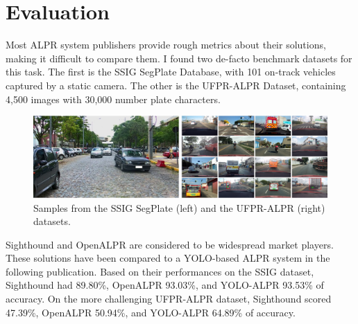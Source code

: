 \section{Evaluation}

Most ALPR system publishers provide rough metrics about their solutions, making it difficult to compare them. I found two de-facto benchmark datasets for this task. The first is the SSIG SegPlate Database\cite{SSIG-ALPR}, with 101 on-track vehicles captured by a static camera. The other is the UFPR-ALPR Dataset\cite{UFPR-ALPR}, containing 4,500 images with 30,000 number plate characters.

\begin{figure}[htb]
 \centerline{\includegraphics[width=1.0\columnwidth]{.//Figure/ALPR/alpr-datasets.png}}
 \caption{Samples from the SSIG SegPlate\cite{SSIG-ALPR} (left) and the UFPR-ALPR\cite{UFPR-ALPR} (right) datasets.}
 \label{fig:simple}
\end{figure}

Sighthound\cite{Sighthound} and OpenALPR\cite{OpenALPR} are considered to be widespread market players. These solutions have been compared to a YOLO-based ALPR system in the following publication\cite{RobustRealTimeALPR_YOLO}. Based on their performances on the SSIG dataset, Sighthound had 89.80\%, OpenALPR 93.03\%, and YOLO-ALPR 93.53\% of accuracy. On the more challenging UFPR-ALPR dataset, Sighthound scored 47.39\%, OpenALPR 50.94\%, and YOLO-ALPR 64.89\% of accuracy.

